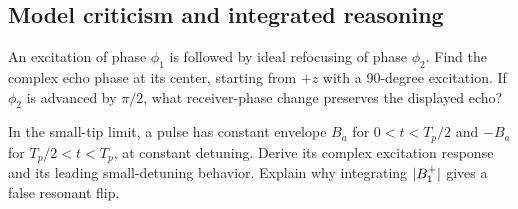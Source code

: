 \subsection{Model criticism and integrated reasoning}
\begin{challengeproblem}
\label{prob:04:phase}
An excitation of phase $\phi_1$ is followed by ideal refocusing of phase
$\phi_2$. Find the complex echo phase at its center, starting from $+z$
with a 90-degree excitation. If $\phi_2$ is advanced by $\pi/2$,
what receiver-phase change preserves the displayed echo?
\end{challengeproblem}
\begin{challengeproblem}
\label{prob:04:biphasic}
In the small-tip limit, a pulse has constant envelope $B_a$ for
$0<t<T_p/2$ and $-B_a$ for $T_p/2<t<T_p$, at constant detuning.
Derive its complex excitation response and its leading small-detuning
behavior. Explain why integrating $\lvert B_{1}^{+}\rvert$ gives a false resonant flip.
\end{challengeproblem}
